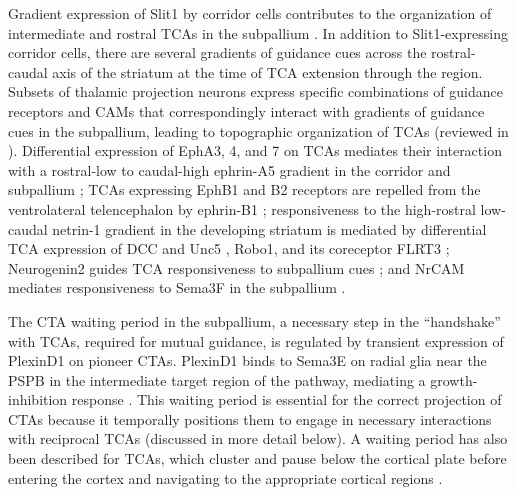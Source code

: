 Gradient expression of Slit1 by corridor cells contributes to the organization of intermediate and rostral TCAs in the subpallium \cite{bielle2011emergent}. 
In addition to Slit1-expressing corridor cells, there are several gradients of guidance cues across the rostral-caudal axis of the striatum at the time of TCA extension through the region. 
Subsets of thalamic projection neurons express specific combinations of guidance receptors and CAMs that correspondingly interact with gradients of guidance cues in the subpallium, leading to topographic organization of TCAs (reviewed in \cite{garel2014inputs,molnar2012mechanisms}). 
Differential expression of EphA3, 4, and 7 on TCAs mediates their interaction with a rostral-low to caudal-high ephrin-A5 gradient in the corridor and subpallium \cite{dufour2003area}; TCAs expressing EphB1 and B2 receptors are repelled from the ventrolateral telencephalon by ephrin-B1 \cite{robichaux2014ephb}; responsiveness to the high-rostral low-caudal netrin-1 gradient in the developing striatum is mediated by differential TCA expression of DCC and Unc5 \cite{powell2008topography}, Robo1, and its coreceptor FLRT3 \cite{leyva2014flrt3}; Neurogenin2 guides TCA responsiveness to subpallium cues \cite{seibt2003neurogenin2}; and NrCAM mediates responsiveness to Sema3F in the subpallium \cite{demyanenko2011nrcam}. 

The CTA waiting period in the subpallium, a necessary step in the “handshake” with TCAs, required for mutual guidance, is regulated by transient expression of PlexinD1 on pioneer CTAs. 
PlexinD1 binds to Sema3E on radial glia near the PSPB in the intermediate target region of the pathway, mediating a growth-inhibition response \cite{deck2013pathfinding}. 
This waiting period is essential for the correct projection of CTAs because it temporally positions them to engage in necessary interactions with reciprocal TCAs (discussed in more detail below). 
A waiting period has also been described for TCAs, which cluster and pause below the cortical plate before entering the cortex and navigating to the appropriate cortical regions \cite{ghosh1992pathfinding,leyva2013and,lund1977development}. 

